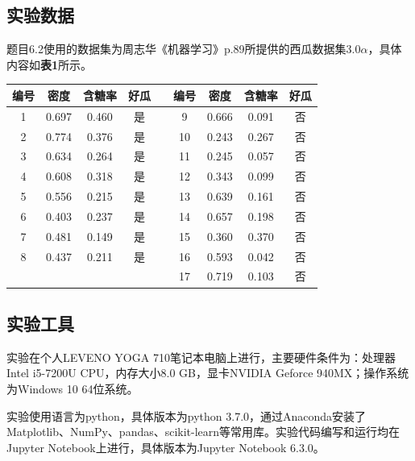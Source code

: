 \documentclass[12pt]{article}
\begin{document}
               
\vbox{}        
\subsection{实验数据}
题目6.2使用的数据集为周志华《机器学习》p.89所提供的西瓜数据集$3.0\alpha$，具体内容如\textbf{表1}所示。
\begin{table}[h]
	\centering
	\begin{tabular}{ccccccccc}
		\toprule
		编号 & 密度 & 含糖率 & 好瓜 & & 编号 & 密度 & 含糖率 & 好瓜\\
		\midrule
		1 & 0.697 & 0.460 & 是 & & 9  & 0.666 & 0.091 & 否\\
		2 & 0.774 & 0.376 & 是 & & 10 & 0.243 & 0.267 & 否\\
		3 & 0.634 & 0.264 & 是 & & 11 & 0.245 & 0.057 & 否\\
		4 & 0.608 & 0.318 & 是 & & 12 & 0.343 & 0.099 & 否\\
		5 & 0.556 & 0.215 & 是 & & 13 & 0.639 & 0.161 & 否\\
		6 & 0.403 & 0.237 & 是 & & 14 & 0.657 & 0.198 & 否\\
		7 & 0.481 & 0.149 & 是 & & 15 & 0.360 & 0.370 & 否\\
		8 & 0.437 & 0.211 & 是 & & 16 & 0.593 & 0.042 & 否\\
		  &       &       &    & & 17 & 0.719 & 0.103 & 否\\
		\bottomrule
	\end{tabular}
\end{table}
\par

\vbox{}
\subsection{实验工具}
实验在个人LEVENO YOGA 710笔记本电脑上进行，主要硬件条件为：处理器Intel i5-7200U CPU，内存大小8.0 GB，显卡NVIDIA Geforce 940MX；操作系统为Windows 10 64位系统。\par 
实验使用语言为python，具体版本为python 3.7.0，通过Anaconda安装了Matplotlib、NumPy、pandas、scikit-learn等常用库。实验代码编写和运行均在Jupyter Notebook上进行，具体版本为Jupyter Notebook 6.3.0。

\vbox{}
\end{document}
